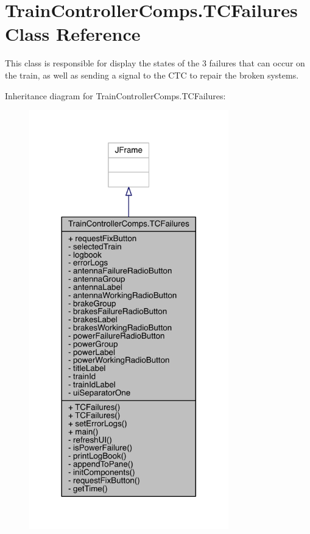 \hypertarget{classTrainControllerComps_1_1TCFailures}{}\section{Train\+Controller\+Comps.\+T\+C\+Failures Class Reference}
\label{classTrainControllerComps_1_1TCFailures}


This class is responsible for display the states of the 3 failures that can occur on the train, as well as sending a signal to the C\+TC to repair the broken systems.  




Inheritance diagram for Train\+Controller\+Comps.\+T\+C\+Failures\+:
\nopagebreak
\begin{figure}[H]
\begin{center}
\leavevmode
\includegraphics[width=245pt]{classTrainControllerComps_1_1TCFailures__inherit__graph}
\end{center}
\end{figure}


